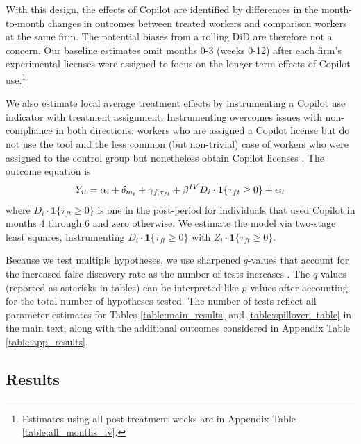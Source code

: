 \documentclass{article}
\begin{document}
With this design, the effects of Copilot are identified by differences in the month-to-month changes in outcomes between treated workers and comparison workers at the same firm. The potential biases from a rolling DiD \citep{goodman2021difference} are therefore not a concern. Our baseline estimates omit months 0-3 (weeks 0-12) after each firm's experimental licenses were assigned to focus on the longer-term effects of Copilot use.\footnote{Estimates using all post-treatment weeks are in Appendix Table \ref{table:all_months_iv}.}

We also estimate local average treatment effects by instrumenting a Copilot use indicator with treatment assignment. Instrumenting overcomes issues with non-compliance in both directions: workers who are assigned a Copilot license but do not use the tool and the less common (but non-trivial) case of workers who were assigned to the control group but nonetheless obtain Copilot licenses \citep{duflo2001schooling,hudson2017interpreting}. The outcome equation is \begin{equation}
    Y_{it} = \alpha_i + \delta_{m_t} + \gamma_{f,\tau_{ft}} + \beta^{IV} D_i\cdot\mathbf{1}\{\tau_{ft}\geq0\}  + \epsilon_{it}\label{eqIV}\\
\end{equation}
where $D_i\cdot\mathbf{1}\{\tau_{ft}\geq0\}$ is one in the post-period for individuals that used Copilot in months 4 through 6 and zero otherwise. We estimate the model via two-stage least squares, instrumenting $D_i\cdot\mathbf{1}\{\tau_{ft}\geq0\}$ with $Z_{i}\cdot\mathbf{1}\{\tau_{ft}\geq0\}$.

Because we test multiple hypotheses, we use sharpened $q$-values that account for the increased false discovery rate as the number of tests increases \citep{anderson2008multiple}. The $q$-values (reported as asterisks in tables) can be interpreted like $p$-values after accounting for the total number of hypotheses tested. The number of tests reflect all parameter estimates for Tables \ref{table:main_results} and \ref{table:spillover_table} in the main text, along with the additional outcomes considered in Appendix Table \ref{table:app_results}. 

\subsection{Results}
\label{sec:maineffects}
\end{document}

